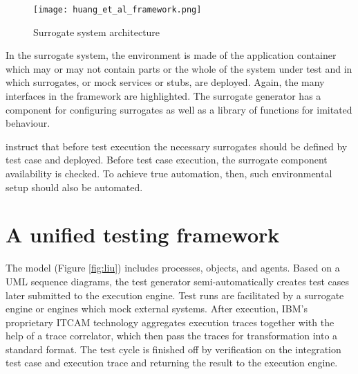\documentclass[12pt,a4paper,oneside,pdftex]{report}
\begin{document}
\begin{figure}[H]
  \begin{center}
    \texttt{[image: huang\_et\_al\_framework.png]}
    \caption{Surrogate system architecture \citep{huang2008surrogate}}
    \label{fig:huang}
  \end{center}
\end{figure}


\begin{comment}
\begin{figure}[H]
  \begin{center}
    \texttt{[image: huang\_testing\_process.png]}
    \caption{The testing processes by \citet{huang2008surrogate}}
    \label{fig:huangtesting} 
  \end{center}
\end{figure}
\end{comment}

In the surrogate system, the environment is made of the application container which may or may not contain parts or the whole of the system under test and in which surrogates, or mock services or stubs, are deployed. Again, the many interfaces in the framework are highlighted. The surrogate generator has a component for configuring surrogates as well as a library of functions for imitated behaviour.

\citet{huang2008surrogate} instruct that before test execution the necessary surrogates should be defined by test case and deployed. Before test case execution, the surrogate component availability is checked. To achieve true automation, then, such environmental setup should also be automated.


\section{A unified testing framework}

The \citet{liu2009unified} model (Figure \ref{fig:liu}) includes processes, objects, and agents. Based on a UML sequence diagrams, the test generator semi-automatically creates test cases later submitted to the execution engine. Test runs are facilitated by a surrogate engine or engines which mock external systems. After execution, IBM's proprietary ITCAM technology aggregates execution traces together with the help of a trace correlator, which then pass the traces for transformation into a standard format. The test cycle is finished off by verification on the integration test case and execution trace and returning the result to the execution engine.
\end{document}
